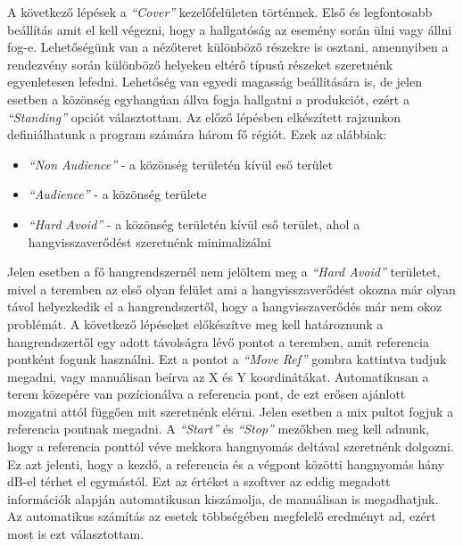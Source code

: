 A következő lépések a \textit{``Cover''} kezelőfelületen történnek.
Első és legfontosabb beállítás amit el kell végezni, hogy a hallgatóság az esemény során ülni vagy állni fog-e.
Lehetőségünk van a nézőteret különböző részekre is osztani, amennyiben a rendezvény során különböző helyeken
eltérő típusú részeket szeretnénk egyenletesen lefedni. Lehetőség van egyedi magasság beállítására is,
de jelen esetben a közönség egyhangúan állva fogja hallgatni a produkciót, ezért a \textit{``Standing''} opciót választottam.
Az előző lépésben elkészített rajzunkon definiálhatunk a program számára három fő régiót.
\newline Ezek az alábbiak:
\begin{itemize}
	\item \textit{``Non Audience''} - a közönség területén kívül eső terület
	\item \textit{``Audience''} - a közönség területe
	\item \textit{``Hard Avoid''} - a közönség területén kívül eső terület, ahol a hangvisszaverődést szeretnénk minimalizálni
\end{itemize}
Jelen esetben a fő hangrendszernél nem jelöltem meg a \textit{``Hard Avoid''} területet, mivel a teremben az első olyan felület
ami a hangvisszaverődést okozna már olyan távol helyezkedik el a hangrendszertől, hogy a hangvisszaverődés már nem okoz problémát.
A következő lépéseket előkészítve meg kell határoznunk a hangrendszertől egy adott távolságra lévő pontot a teremben,
amit referencia pontként fogunk használni. Ezt a pontot a \textit{``Move Ref''} gombra kattintva tudjuk megadni,
vagy manuálisan beírva az X és Y koordinátákat. Automatikusan a terem közepére van pozícionálva a referencia pont, de
ezt erősen ajánlott mozgatni attól függően mit szeretnénk elérni. Jelen esetben a mix pultot fogjuk a referencia pontnak megadni.
A \textit{``Start''} és \textit{``Stop''} mezőkben meg kell adnunk, hogy a referencia ponttól véve mekkora hangnyomás
deltával szeretnénk dolgozni. Ez azt jelenti, hogy a kezdő, a referencia és a végpont közötti hangnyomás hány dB-el térhet el egymástól.
Ezt az értéket a szoftver az eddig megadott információk alapján automatikusan kiszámolja, de manuálisan is megadhatjuk.
Az automatikus számítás az esetek többségében megfelelő eredményt ad, ezért most is ezt választottam.
